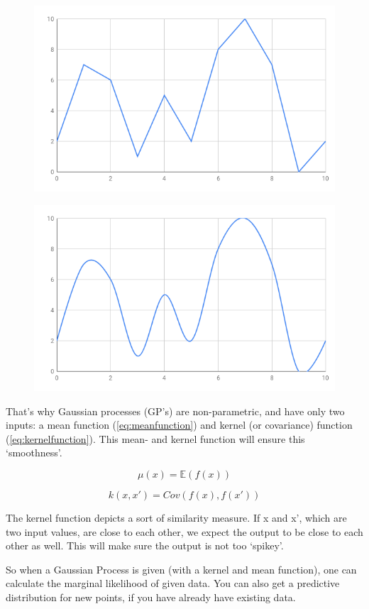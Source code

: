 \documentclass[a4paper, 10pt, conference]{ieeeconf}
\begin{document}
\begin{figure}[!ht]
    \centering
    \includegraphics[width=0.6\linewidth]{report/images/examplediagram.png}
    \caption{}
    \label{fig:examplediagram}
\end{figure}
\begin{figure}[!ht]
    \centering
    \includegraphics[width=0.6\linewidth]{report/images/examplediagram_vloeiend.png}
    \caption{}
    \label{fig:examplediagram_vloeiend}
\end{figure}

That's why Gaussian processes (GP's) are non-parametric, and have only two inputs: a mean function (\ref{eq:meanfunction}) and kernel (or covariance) function (\ref{eq:kernelfunction}). This mean- and kernel function will ensure this `smoothness'.

\begin{equation}\label{eq:meanfunction}
    \mu (x) = \mathbb{E}(f(x))
\end{equation}


\begin{equation}\label{eq:kernelfunction}
    k(x,x') = Cov(f(x), f(x'))
\end{equation}

The kernel function depicts a sort of similarity measure. If x and x', which are two input values, are close to each other, we expect the output to be close to each other as well. This will make sure the output is not too `spikey'.

So when a Gaussian Process is given (with a kernel and mean function), one can calculate the marginal likelihood of given data. You can also get a predictive distribution for new points, if you have already have existing data.
\end{document}
